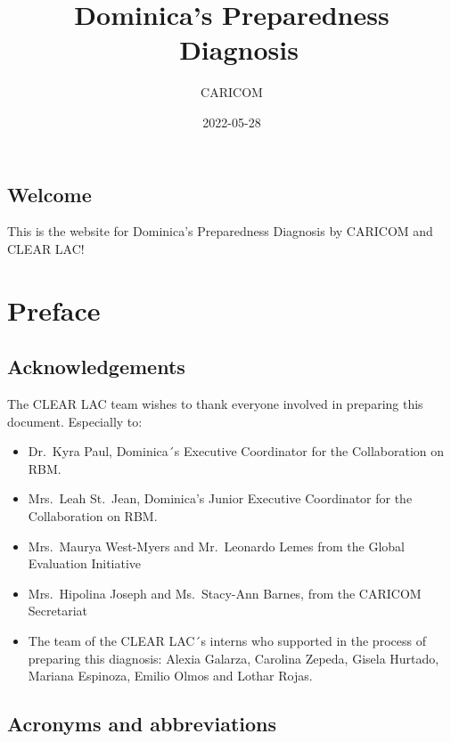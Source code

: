 \documentclass[
]{book}
\title{Dominica's Preparedness ~Diagnosis}
\author{CARICOM}
\date{2022-05-28}
\begin{document}
\maketitle

{
\setcounter{tocdepth}{1}
\tableofcontents
}
\hypertarget{welcome}{%
\chapter*{Welcome}\label{welcome}}

This is the website for Dominica's Preparedness Diagnosis by CARICOM and CLEAR LAC!

\hypertarget{part-preface}{%
\part{Preface}\label{part-preface}}

\hypertarget{acknowledgements}{%
\chapter*{Acknowledgements}\label{acknowledgements}}

The CLEAR LAC team wishes to thank everyone involved in preparing this document. Especially to:

\begin{itemize}
\item
  Dr.~Kyra Paul, Dominica´s Executive Coordinator for the Collaboration on RBM.
\item
  Mrs.~Leah St.~Jean, Dominica's Junior Executive Coordinator for the Collaboration on RBM.
\item
  Mrs.~Maurya West-Myers and Mr.~Leonardo Lemes from the Global Evaluation Initiative
\item
  Mrs.~Hipolina Joseph and Ms.~Stacy-Ann Barnes, from the CARICOM Secretariat
\item
  The team of the CLEAR LAC´s interns who supported in the process of preparing this diagnosis: Alexia Galarza, Carolina Zepeda, Gisela Hurtado, Mariana Espinoza, Emilio Olmos and Lothar Rojas.
\end{itemize}

\hypertarget{acronyms-and-abbreviations}{%
\chapter*{Acronyms and abbreviations}\label{acronyms-and-abbreviations}}
\end{document}
